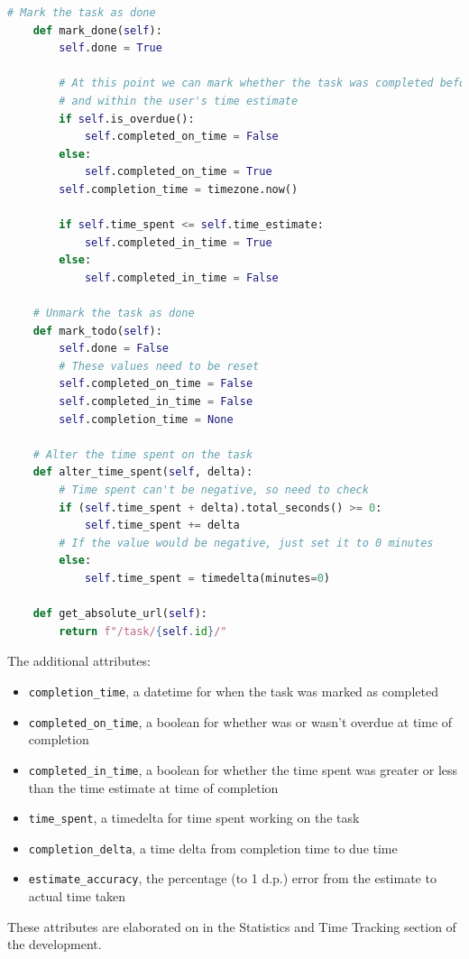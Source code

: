 \documentclass{article}
\begin{document}
\begin{lstlisting}[language=Python]
    # Mark the task as done
    def mark_done(self):
        self.done = True

        # At this point we can mark whether the task was completed before it's due date,
        # and within the user's time estimate
        if self.is_overdue():
            self.completed_on_time = False
        else:
            self.completed_on_time = True
        self.completion_time = timezone.now()

        if self.time_spent <= self.time_estimate:
            self.completed_in_time = True
        else:
            self.completed_in_time = False

    # Unmark the task as done
    def mark_todo(self):
        self.done = False
        # These values need to be reset
        self.completed_on_time = False
        self.completed_in_time = False
        self.completion_time = None

    # Alter the time spent on the task
    def alter_time_spent(self, delta):
        # Time spent can't be negative, so need to check
        if (self.time_spent + delta).total_seconds() >= 0:
            self.time_spent += delta
        # If the value would be negative, just set it to 0 minutes
        else:
            self.time_spent = timedelta(minutes=0)

    def get_absolute_url(self):
        return f"/task/{self.id}/"
\end{lstlisting}

The additional attributes:
\begin{itemize}
	\item \texttt{completion\_time},
	      a datetime for when the task was marked as completed
	\item \texttt{completed\_on\_time},
	      a boolean for whether was or wasn't overdue at time of completion
	\item \texttt{completed\_in\_time},
	      a boolean for whether the time spent was greater or less than the time estimate at time of completion
	\item \texttt{time\_spent},
	      a timedelta for time spent working on the task
	\item \texttt{completion\_delta},
	      a time delta from completion time to due time
	\item \texttt{estimate\_accuracy},
	      the percentage (to 1 d.p.) error from the estimate to actual time taken
\end{itemize}

These attributes are elaborated on in the Statistics and Time Tracking section of the development.
\end{document}
